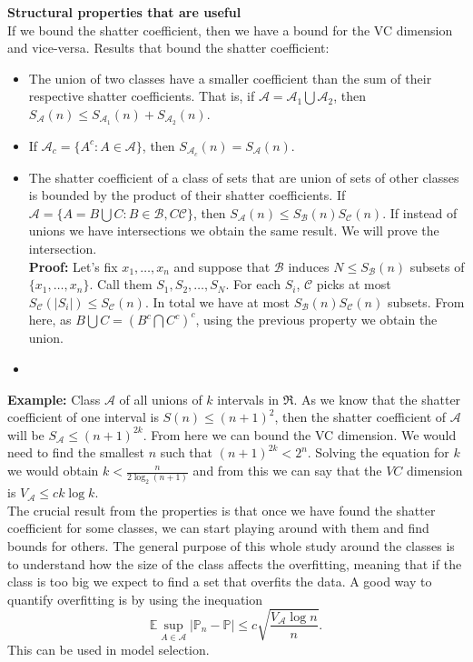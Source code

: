 \documentclass[11pt, english]{article}
\begin{document}
\textbf{Structural properties that are useful\\}
If we bound the shatter coefficient, then we have a bound for the VC dimension and vice-versa. Results that bound the shatter coefficient:
\begin{itemize}
	\item The union of two classes have a smaller coefficient than the sum of their respective shatter coefficients. That is, if $\mathcal{A}=\mathcal{A}_1\bigcup\mathcal{A}_2$, then 
	$S_{\mathcal{A}} (n)\leq S_{\mathcal{A}_1}(n) +S_{\mathcal{A}_2}(n)$.
 	\item If $\mathcal{A}_c=\{A^c:A\in\mathcal{A}\}$, then $S_{\mathcal{A}_c}(n)=S_{\mathcal{A}}(n)$.
	\item The shatter coefficient of a class of sets that are union of sets of other classes is bounded by the product of their shatter coefficients. If $\mathcal{A}=\{A=B\bigcup C:B\in\mathcal{B},C\mathcal{C}\}$, then $S_{\mathcal{A}}(n)\leq S_{\mathcal{B}}(n)S_{\mathcal{C}}(n)$. If instead of unions we have intersections we obtain the same result. We will prove the intersection.\\
	\textbf{Proof:} Let's fix $x_1,\dots,x_n$ and suppose that $\mathcal{B}$ induces $N\leq S_{\mathcal{B}}(n)$ subsets of $\{x_1,\dots,x_n\}$. Call them $S_1,S_2,\dots,S_N$. For each $S_i$, $\mathcal{C}$ picks at most $S_{\mathcal{C}}(|S_i|)\leq S_{\mathcal{C}}(n)$. In total we have at most $S_{\mathcal{B}}(n)S_{\mathcal{C}}(n)$ subsets. From here, as $B\bigcup C=(B^c\bigcap C^c)^c$, using the previous property we obtain the union.
	\item 
\end{itemize}
\textbf{Example:} Class $\mathcal{A}$ of all unions of $k$ intervals in $\Re$. As we know that the shatter coefficient of one interval is $S(n)\leq (n+1)^2$, then the shatter coefficient of $\mathcal{A}$ will be $S_{\mathcal{A}}\leq (n+1)^{2k}$. From here we can bound the VC dimension. We would need to find the smallest $n$ such that $(n+1)^{2k}<2^n$. Solving the equation for $k$ we would obtain $k<\frac{n}{2\log_2(n+1)}$ and from this we can say that the $VC$ dimension is $V_{\mathcal{A}}\leq ck\log k$.\\

The crucial result from the properties is that once we have found the shatter coefficient for some classes, we can start playing around with them and find bounds for others. The general purpose of this whole study around the classes is to understand how the size of the class  affects the overfitting, meaning that if the class is too big we expect to find a set that overfits the data. A good way to quantify overfitting is by using the inequation 
\begin{equation}
	\mathbb{E}\underset{A\in\mathcal{A}}{\sup}|\mathbb{P}_n-\mathbb{P}|\leq c\sqrt{\frac{V_{\mathcal{A}}\log n}{n}}.
\end{equation}
This can be used in model selection.
\end{document}
